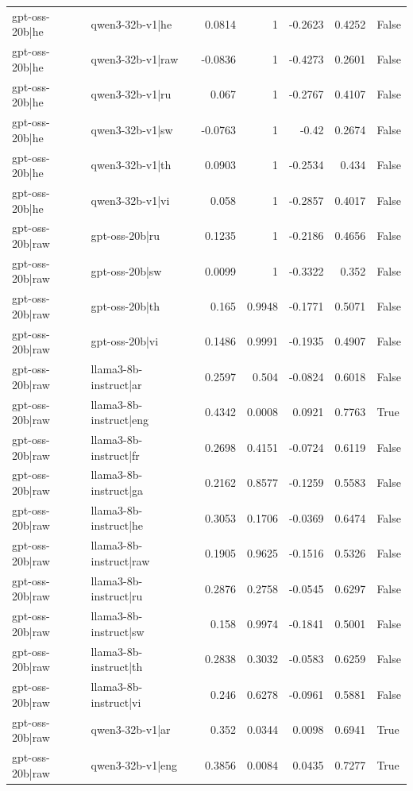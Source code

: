\begin{table}
\begin{tabular}{l l r r r r l}
gpt-oss-20b|he & qwen3-32b-v1|he & 0.0814 & 1 & -0.2623 & 0.4252 & False \\
gpt-oss-20b|he & qwen3-32b-v1|raw & -0.0836 & 1 & -0.4273 & 0.2601 & False \\
gpt-oss-20b|he & qwen3-32b-v1|ru & 0.067 & 1 & -0.2767 & 0.4107 & False \\
gpt-oss-20b|he & qwen3-32b-v1|sw & -0.0763 & 1 & -0.42 & 0.2674 & False \\
gpt-oss-20b|he & qwen3-32b-v1|th & 0.0903 & 1 & -0.2534 & 0.434 & False \\
gpt-oss-20b|he & qwen3-32b-v1|vi & 0.058 & 1 & -0.2857 & 0.4017 & False \\
gpt-oss-20b|raw & gpt-oss-20b|ru & 0.1235 & 1 & -0.2186 & 0.4656 & False \\
gpt-oss-20b|raw & gpt-oss-20b|sw & 0.0099 & 1 & -0.3322 & 0.352 & False \\
gpt-oss-20b|raw & gpt-oss-20b|th & 0.165 & 0.9948 & -0.1771 & 0.5071 & False \\
gpt-oss-20b|raw & gpt-oss-20b|vi & 0.1486 & 0.9991 & -0.1935 & 0.4907 & False \\
gpt-oss-20b|raw & llama3-8b-instruct|ar & 0.2597 & 0.504 & -0.0824 & 0.6018 & False \\
gpt-oss-20b|raw & llama3-8b-instruct|eng & 0.4342 & 0.0008 & 0.0921 & 0.7763 & True \\
gpt-oss-20b|raw & llama3-8b-instruct|fr & 0.2698 & 0.4151 & -0.0724 & 0.6119 & False \\
gpt-oss-20b|raw & llama3-8b-instruct|ga & 0.2162 & 0.8577 & -0.1259 & 0.5583 & False \\
gpt-oss-20b|raw & llama3-8b-instruct|he & 0.3053 & 0.1706 & -0.0369 & 0.6474 & False \\
gpt-oss-20b|raw & llama3-8b-instruct|raw & 0.1905 & 0.9625 & -0.1516 & 0.5326 & False \\
gpt-oss-20b|raw & llama3-8b-instruct|ru & 0.2876 & 0.2758 & -0.0545 & 0.6297 & False \\
gpt-oss-20b|raw & llama3-8b-instruct|sw & 0.158 & 0.9974 & -0.1841 & 0.5001 & False \\
gpt-oss-20b|raw & llama3-8b-instruct|th & 0.2838 & 0.3032 & -0.0583 & 0.6259 & False \\
gpt-oss-20b|raw & llama3-8b-instruct|vi & 0.246 & 0.6278 & -0.0961 & 0.5881 & False \\
gpt-oss-20b|raw & qwen3-32b-v1|ar & 0.352 & 0.0344 & 0.0098 & 0.6941 & True \\
gpt-oss-20b|raw & qwen3-32b-v1|eng & 0.3856 & 0.0084 & 0.0435 & 0.7277 & True \\

\end{tabular}
\end{table}

